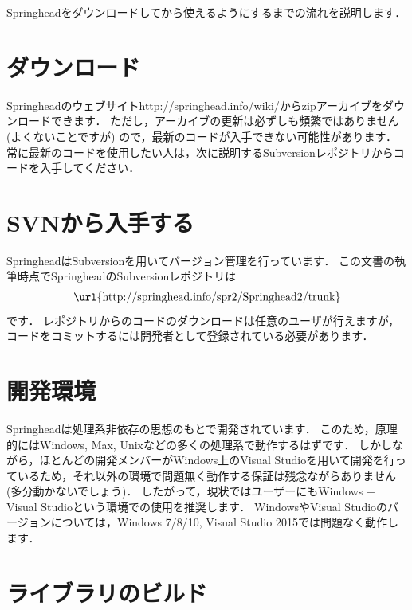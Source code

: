 Springheadをダウンロードしてから使えるようにするまでの流れを説明します．

\section{ダウンロード}

Springheadのウェブサイト\url{http://springhead.info/wiki/}からzipアーカイブをダウンロードできます．
\KLUDGE ただし，アーカイブの更新は必ずしも頻繁ではありません (よくないことですが) ので，最新のコードが入手できない可能性があります．
\KLUDGE 常に最新のコードを使用したい人は，次に説明するSubversionレポジトリからコードを入手してください．

\section{SVNから入手する}

SpringheadはSubversionを用いてバージョン管理を行っています．
\KLUDGE この文書の執筆時点でSpringheadのSubversionレポジトリは
\begin{align*}
\text{\url{http://springhead.info/spr2/Springhead2/trunk}}
\end{align*}
\KLUDGE です．
\KLUDGE レポジトリからのコードのダウンロードは任意のユーザが行えますが，
\KLUDGE コードをコミットするには開発者として登録されている必要があります．

\KLUDGE %

\section{開発環境}

Springheadは処理系非依存の思想のもとで開発されています．
\KLUDGE このため，原理的にはWindows, Max, Unixなどの多くの処理系で動作するはずです．
\KLUDGE しかしながら，ほとんどの開発メンバーがWindows上のVisual Studioを用いて開発を行っているため，それ以外の環境で問題無く動作する保証は残念ながらありません (多分動かないでしょう)．
\KLUDGE したがって，現状ではユーザーにもWindows + Visual Studioという環境での使用を推奨します．
WindowsやVisual Studioのバージョンについては，Windows 7/8/10, Visual Studio 2015では問題なく動作します．

\section{ライブラリのビルド}
\label{libbuild}

